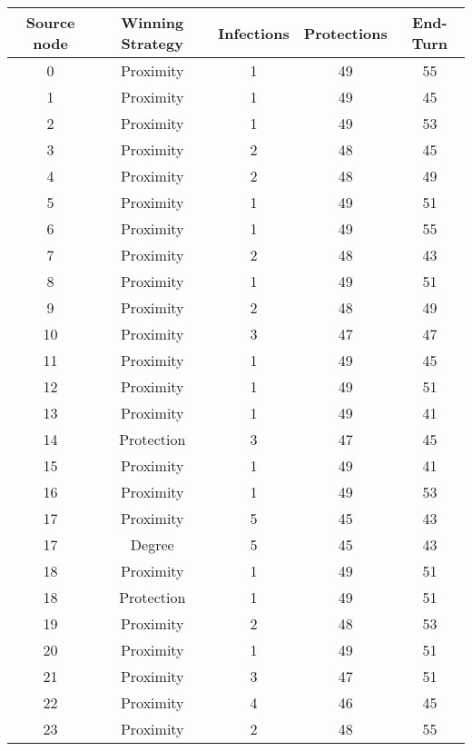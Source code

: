 \documentclass[results.tex]{subfiles}
\begin{document}
\begin{center}
  \begin{tabular}{| c || c | c | c | c |}
    \hline
    {\bfseries Source node} & {\bfseries Winning Strategy} & {\bfseries Infections} & {\bfseries Protections} & {\bfseries End-Turn} \\  %
    \hline\hline
    0 & Proximity & 1 & 49 & 55 \\ 
    \hline
    1 & Proximity & 1 & 49 & 45 \\ 
    \hline
    2 & Proximity & 1 & 49 & 53 \\ 
    \hline
    3 & Proximity & 2 & 48 & 45 \\ 
    \hline
    4 & Proximity & 2 & 48 & 49 \\ 
    \hline
    5 & Proximity & 1 & 49 & 51 \\ 
    \hline
    6 & Proximity & 1 & 49 & 55 \\ 
    \hline
    7 & Proximity & 2 & 48 & 43 \\ 
    \hline
    8 & Proximity & 1 & 49 & 51 \\ 
    \hline
    9 & Proximity & 2 & 48 & 49 \\ 
    \hline
    10 & Proximity & 3 & 47 & 47 \\ 
    \hline
    11 & Proximity & 1 & 49 & 45 \\ 
    \hline
    12 & Proximity & 1 & 49 & 51 \\ 
    \hline
    13 & Proximity & 1 & 49 & 41 \\ 
    \hline
    14 & Protection & 3 & 47 & 45 \\ 
    \hline
    15 & Proximity & 1 & 49 & 41 \\ 
    \hline
    16 & Proximity & 1 & 49 & 53 \\ 
    \hline
    17 & Proximity & 5 & 45 & 43 \\ 
    \hline
    17 & Degree & 5 & 45 & 43 \\ 
    \hline
    18 & Proximity & 1 & 49 & 51 \\ 
    \hline
    18 & Protection & 1 & 49 & 51 \\ 
    \hline
    19 & Proximity & 2 & 48 & 53 \\ 
    \hline
    20 & Proximity & 1 & 49 & 51 \\ 
    \hline
    21 & Proximity & 3 & 47 & 51 \\ 
    \hline
    22 & Proximity & 4 & 46 & 45 \\ 
    \hline
    23 & Proximity & 2 & 48 & 55 \\ 

\end{tabular}
\end{center}
\end{document}
